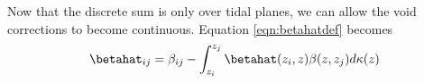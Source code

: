 Now that the discrete sum is only over tidal planes, we can allow the void corrections to become continuous. Equation \ref{eqn:betahatdef} becomes
\begin{equation}
\label{eqn:betahatint}
\betahat_{i j} = \beta_{ i j} - \int_{z_i}^{z_j} \betahat(z_i, z) \beta(z, z_j) d\kappa(z)
\end{equation}
  
  
  